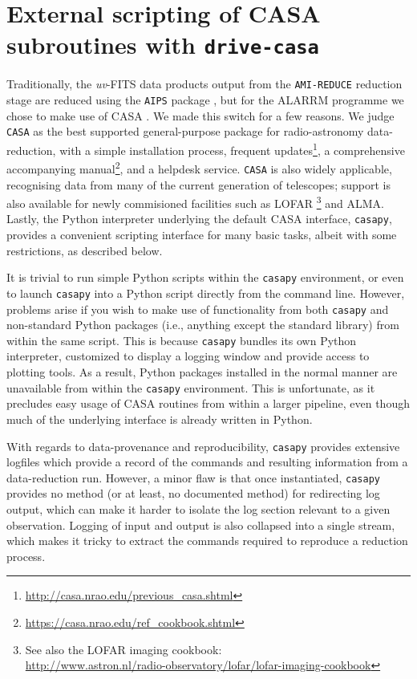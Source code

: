 \documentclass[5p,authoryear]{elsarticle}
\begin{document}
\section{External scripting of CASA subroutines with \texttt{drive-casa}}
\label{sec:drive-casa}
Traditionally, the \textit{uv}-FITS data products output from the \texttt{AMI-REDUCE} reduction stage are reduced using the \texttt{AIPS} package \citep{Fomalont1981}, but for the ALARRM programme we chose to make use of CASA \citep{McMullin2007}. 
We made this switch for a few reasons. 
We judge \texttt{CASA} as the best supported general-purpose package for radio-astronomy data-reduction, 
with a simple installation process, 
frequent updates\footnote{\url{http://casa.nrao.edu/previous_casa.shtml}}, 
a comprehensive accompanying 
manual\footnote{\url{https://casa.nrao.edu/ref_cookbook.shtml}},
and a helpdesk service. 
\texttt{CASA} is also widely applicable, recognising data from many of the current generation of telescopes; support is also available for newly commisioned facilities such as 
LOFAR \citep{vanHaarlem2013}\footnote{%
See also the LOFAR imaging cookbook:\\ 
\url{http://www.astron.nl/radio-observatory/lofar/lofar-imaging-cookbook}
}
and ALMA. 
Lastly, the Python interpreter underlying the default CASA interface, \texttt{casapy}, provides a convenient scripting interface for many basic tasks, albeit with some restrictions, as described below.

It is trivial to run simple Python scripts within the \texttt{casapy} environment, or even to launch \texttt{casapy} into a Python script directly from the command line. 
However, problems arise if you wish to make use of functionality from both \texttt{casapy} and non-standard Python packages (i.e., anything except the standard library) from within the same script.
This is because \texttt{casapy} bundles its own Python interpreter, customized to display a logging window and provide access to plotting tools. 
As a result, Python packages installed in the normal manner are unavailable from within the \texttt{casapy} environment. 
This is unfortunate, as it precludes easy usage of CASA routines from within a larger pipeline, even though much of the underlying interface is already written in Python.

With regards to data-provenance and reproducibility, \texttt{casapy} provides extensive logfiles which provide a record of the commands and resulting information from a data-reduction run. 
However, a minor flaw is that once instantiated, \texttt{casapy} provides no method (or at least, no documented method) for redirecting log output, which can make it harder to isolate the log section relevant to a given observation. 
Logging of input and output is also collapsed into a single stream, which makes it tricky to extract the commands required to reproduce a reduction process.
\end{document}
